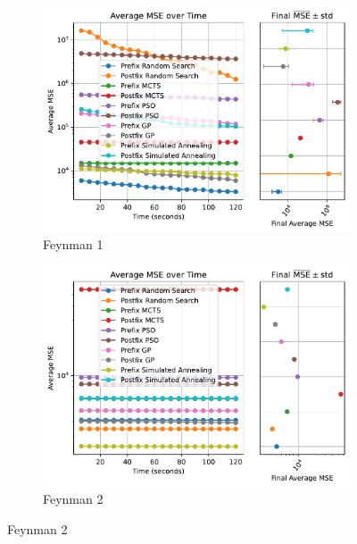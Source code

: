 \documentclass[runningheads]{llncs}
\begin{document}
\begin{figure}
    \centering
    
    \begin{subfigure}[b]{0.4\textwidth}
        \includegraphics[width=\linewidth, keepaspectratio]{AIFeynman_Benchmarks/Feynman_Benchmark_1.pdf}
        \caption{Feynman 1}
        \label{subfig:feynman_1}
    \end{subfigure}
    \begin{subfigure}[b]{0.4\textwidth}
        \includegraphics[width=\linewidth, keepaspectratio]{AIFeynman_Benchmarks/Feynman_Benchmark_2.pdf}
        \caption{Feynman 2}
        \label{subfig:feynman_2}
    \end{subfigure}
    
    \vspace{0.5cm}
    

\end{figure}
\end{document}
